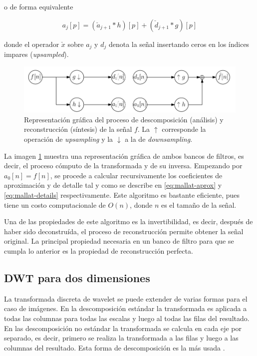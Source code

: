 \noindent o de forma equivalente 

\begin{equation}
	a_j[p] = ( \check a_{j+1} * h )[p] + ( \check d_{j+1} * g )[p]
\end{equation}

\noindent donde el operador $\check x$ sobre $a_j$ y $d_j$ denota la señal insertando ceros en los índices impares
(\textit{upsampled}).

\begin{figure}\label{fig:dwt-filterbanks-1D}
	\includegraphics[scale=0.5]{Graphics/dwt-filterbanks-1D.png}
	\caption{Representación gráfica del proceso de descomposición (análisis) y reconstrucción (síntesis) de la señal $f$. La $\uparrow$ corresponde la operación de \textit{upsampling} y la $\downarrow$ a la de \textit{downsampling}. }\label{fig:dwt-filterbanks-1D}
\end{figure}

La imagen \ref{fig:dwt-filterbanks-1D} muestra una representación gráfica de ambos bancos de filtros, es decir, 
el proceso cómputo de la transformada y de su inversa. Empezando por $a_0[n] = f[n]$, se procede a calcular recursivamente
los coeficientes de aproximación y de detalle tal y como se describe en \ref{eq:mallat-aprox} y \ref{eq:mallat-details}
respectivamente. Este algoritmo es bastante eficiente, pues tiene un costo computacionale de $O(n)$, donde $n$
es el tamaño de la señal. 

Una de las propiedades de este algoritmo es la invertibilidad, es decir, después de haber sido deconstruída, el proceso
de reconstrucción permite obtener la señal original. La principal propiedad necesaria en un banco de filtro 
para que se cumpla lo anterior es la propiedad de reconstrucción perfecta. 

\subsection{DWT para dos dimensiones}\label{section:dwt-2d}

La transformada discreta de wavelet se puede extender de varias formas para el caso de imágenes.
En la descomposición estándar la transformada es aplicada a todas las columnas para todas las escalas
y luego al todas las filas del resultado. En las descomposición no estándar la transformada se calcula en cada
eje por separado, es decir, primero se realiza la transformada a las filas y luego a las columnas del resultado. 
Esta forma de descomposición es la más usada \cite{WaveletVariants2D}.

